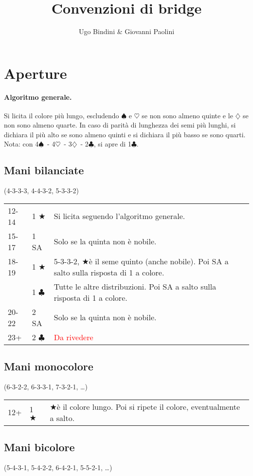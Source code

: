 \documentclass[a4paper,10pt]{article}
\title{Convenzioni di bridge}
\author{Ugo Bindini \& Giovanni Paolini}
\renewcommand{\c}{$\clubsuit$\xspace}
\renewcommand{\d}{$\diamondsuit$\xspace}
\newcommand{\h}{$\heartsuit$\xspace}
\newcommand{\s}{$\spadesuit$\xspace}
\renewcommand{\j}{$\bigstar$\xspace}
\newcommand{\sa}{SA\xspace}
\newcommand{\smallspace}{\vskip0.3cm}
\newcommand{\note}[1]{\textcolor{red}{#1}}
\newenvironment{threecol}
  {\smallspace\noindent\begin{tabular}{l l p{0.7\textwidth}}}
  {\end{tabular}\smallspace}
\begin{document}
\maketitle


\section{Aperture}

\paragraph{Algoritmo generale.}
Si licita il colore pi\`u lungo, escludendo \s e \h se non sono almeno quinte e le \d se non sono almeno quarte.
In caso di parit\`a di lunghezza dei semi pi\`u lunghi, si dichiara il pi\`u alto se sono almeno quinti e si dichiara il pi\`u basso se sono quarti.
Nota: con 4\s\ - 4\h\ - 3\d\ - 2\c, si apre di 1\c.

\subsection{Mani bilanciate}
(4-3-3-3, 4-4-3-2, 5-3-3-2)
\smallspace

\begin{threecol}
 12-14 & 1 \j & Si licita seguendo l'algoritmo generale.\\
 15-17 & 1 \sa & Solo se la quinta non \`e nobile.\\
 18-19 & 1 \j & 5-3-3-2, \j \`e il seme quinto (anche nobile). Poi \sa a salto sulla risposta di 1 a colore.\\
       & 1 \c & Tutte le altre distribuzioni. Poi \sa a salto sulla risposta di 1 a colore.\\
 20-22 & 2 \sa & Solo se la quinta non è nobile.\\
 23+ & 2 \c & \note{Da rivedere}
\end{threecol}


\subsection{Mani monocolore}
(6-3-2-2, 6-3-3-1, 7-3-2-1, \dots)

\begin{threecol}
 12+ & 1 \j & \j \`e il colore lungo. Poi si ripete il colore, eventualmente a salto.
\end{threecol}


\subsection{Mani bicolore}
(5-4-3-1, 5-4-2-2, 6-4-2-1, 5-5-2-1, \dots)
\end{document}
